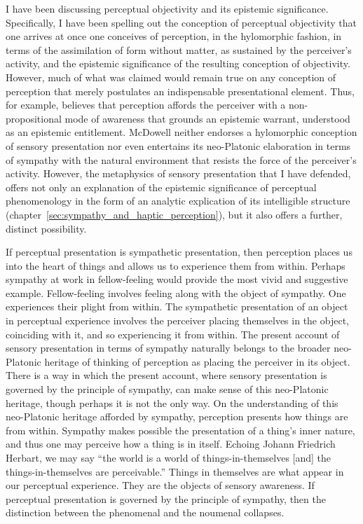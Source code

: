 I have been discussing perceptual objectivity and its epistemic significance. Specifically, I have been spelling out the conception of perceptual objectivity that one arrives at once one conceives of perception, in the hylomorphic fashion, in terms of the assimilation of form without matter, as sustained by the perceiver's activity, and the epistemic significance of the resulting conception of objectivity. However, much of what was claimed would remain true on any conception of perception that merely postulates an indispensable presentational element. Thus, for example, \citet{McDowell:2008fk} believes that perception affords the perceiver with a non-propositional mode of awareness that grounds an epistemic warrant, understood as an epistemic entitlement. McDowell neither endorses a hylomorphic conception of sensory presentation nor even entertains its neo-Platonic elaboration in terms of sympathy with the natural environment that resists the force of the perceiver's activity. However, the metaphysics of sensory presentation that I have defended, offers not only an explanation of the epistemic significance of perceptual phenomenology in the form of an analytic explication of its intelligible structure (chapter~\ref{sec:sympathy_and_haptic_perception}), but it also offers a further, distinct possibility.

If perceptual presentation is sympathetic presentation, then perception places us into the heart of things and allows us to experience them from within.  Perhaps sympathy at work in fellow-feeling would provide the most vivid and suggestive example. Fellow-feeling involves feeling along with the object of sympathy. One experiences their plight from within. The sympathetic presentation of an object in perceptual experience involves the perceiver placing themselves in the object, coinciding with it, and so experiencing it from within. The present account of sensory presentation in terms of sympathy naturally belongs to the broader neo-Platonic heritage of thinking of perception as placing the perceiver in its object. There is a way in which the present account, where sensory presentation is governed by the principle of sympathy, can make sense of this neo-Platonic heritage, though perhaps it is not the only way. On the understanding of this neo-Platonic heritage afforded by sympathy, perception presents how things are from within. Sympathy makes possible the presentation of a thing's inner nature, and thus one may perceive how a thing is in itself. Echoing Johann Friedrich Herbart, we may say ``the world is a world of things-in-themselves [and] the things-in-themselves are perceivable.'' Things in themselves are what appear in our perceptual experience. They are the objects of sensory awareness. If perceptual presentation is governed by the principle of sympathy, then the distinction between the phenomenal and the noumenal collapses.

